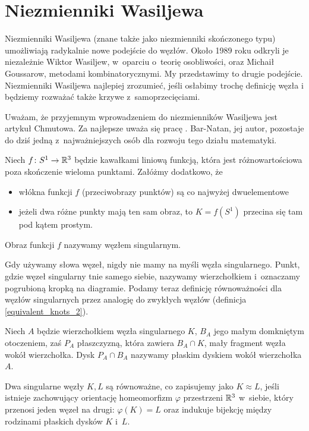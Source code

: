 \section{Niezmienniki Wasiljewa} %
\label{sec:vassiliev}
Niezmienniki Wasiljewa (znane także jako niezmienniki skończonego typu) umożliwiają radykalnie nowe podejście do węzłów.
Około 1989 roku odkryli je niezależnie Wiktor Wasiljew, w~oparciu o~teorię osobliwości, oraz Michaił Goussarow, metodami kombinatorycznymi.
My przedstawimy to drugie podejście.
Niezmienniki Wasiljewa najlepiej zrozumieć, jeśli osłabimy trochę definicję węzła i będziemy rozważać także krzywe z~samoprzecięciami.

Uważam, że przyjemnym wprowadzeniem do niezmienników Wasiljewa jest artykuł \cite{chmutov12} Chmutowa.
Za najlepsze uważa się pracę \cite{barnatan_95}.
Bar-Natan, jej autor, pozostaje do dziś jedną z~najważniejszych osób dla rozwoju tego działu matematyki.

\begin{definition}
    Niech $f \colon S^1 \to \mathbb R^3$ będzie kawałkami liniową funkcją, która jest różnowartościowa poza skończenie wieloma punktami.
    Załóżmy dodatkowo, że
    \begin{itemize}
        \item włókna funkcji $f$ (przeciwobrazy punktów) są co najwyżej dwuelementowe
        \item jeżeli dwa różne punkty mają ten sam obraz, to $K = f(S^1)$ przecina się tam pod kątem prostym.
    \end{itemize}
    Obraz funkcji $f$ nazywamy węzłem singularnym.
\end{definition}

Gdy używamy słowa węzeł, nigdy nie mamy na myśli węzła singularnego.
Punkt, gdzie węzeł singularny tnie samego siebie, nazywamy wierzchołkiem i~oznaczamy pogrubioną kropką na diagramie.
Podamy teraz definicję równoważności dla węzłów singularnych przez analogię do zwykłych węzłów (definicja \ref{equivalent_knots_2}).

\begin{definition}
    Niech $A$ będzie wierzchołkiem węzła singularnego $K$, $B_A$ jego małym domkniętym otoczeniem, zaś $P_A$ płaszczyzną, która zawiera $B_A \cap K$, mały fragment węzła wokół wierzchołka.
    Dysk $P_A \cap B_A$ nazywamy płaskim dyskiem wokół wierzchołka $A$.
\end{definition}

\begin{definition}
    Dwa singularne węzły $K, L$ są równoważne, co zapisujemy jako $K \approx L$, jeśli istnieje zachowujący orientację homeomorfizm $\varphi$ przestrzeni $\mathbb R^3$ w~siebie, który przenosi jeden węzeł na drugi: $\varphi(K) = L$ oraz indukuje bijekcję między rodzinami płaskich dysków $K$ i~$L$.
\end{definition}

